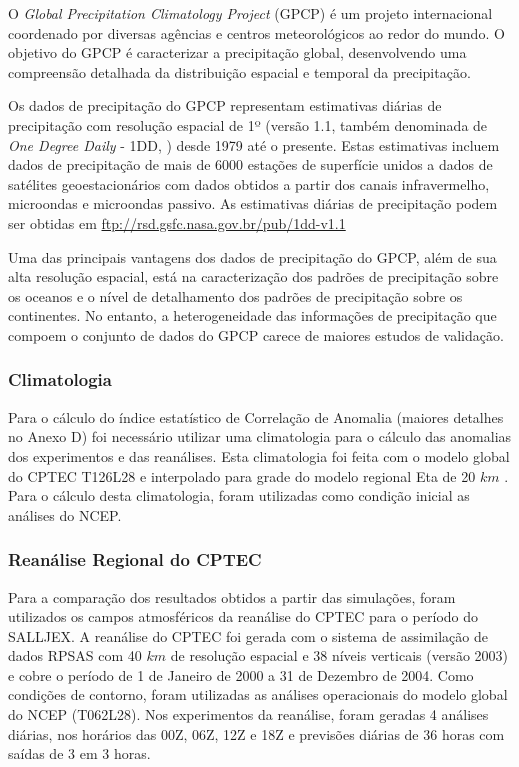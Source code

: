 O \textit{Global Precipitation Climatology Project} (GPCP) \cite{wcrp86} é um projeto internacional coordenado por diversas agências e centros meteorológicos ao redor do mundo. O objetivo do GPCP é caracterizar a precipitação global, desenvolvendo uma compreensão detalhada da distribuição espacial e temporal da precipitação.

Os dados de precipitação do GPCP representam estimativas diárias de precipitação com resolução espacial de 1º (versão 1.1, também denominada de \textit{One Degree Daily} - 1DD, \cite{huffmanetal97}) desde 1979 até o presente. Estas estimativas incluem dados de precipitação de mais de 6000 estações de superfície unidos a dados de satélites geoestacionários com dados obtidos a partir dos canais  infravermelho, microondas e microondas passivo. As estimativas diárias de precipitação podem ser obtidas em \url{ftp://rsd.gsfc.nasa.gov.br/pub/1dd-v1.1}

Uma das principais vantagens dos dados de precipitação do GPCP, além de sua alta resolução espacial, está na caracterização dos padrões de precipitação sobre os oceanos e o nível de detalhamento dos padrões de precipitação sobre os continentes. No entanto, a heterogeneidade das informações de precipitação que compoem o conjunto de dados do GPCP carece de maiores estudos de validação.

\subsubsection{Climatologia}

Para o cálculo do índice estatístico de Correlação de Anomalia (maiores detalhes no Anexo D) foi necessário utilizar uma climatologia para o cálculo das anomalias dos experimentos e das reanálises. Esta climatologia foi feita com o modelo global do CPTEC T126L28 e interpolado para grade do modelo regional Eta de 20 $km$ \cite{sapucci09}. Para o cálculo desta climatologia, foram utilizadas como condição inicial as análises do NCEP.

\subsubsection{Reanálise Regional do CPTEC}
    
Para a comparação dos resultados obtidos a partir das simulações, foram utilizados os campos atmosféricos da reanálise do CPTEC \cite{aravequiaetal07} para o período do SALLJEX. A reanálise do CPTEC foi gerada com o sistema de assimilação de dados RPSAS com 40 $km$ de resolução espacial e 38 níveis verticais (versão 2003) e cobre o período de 1 de Janeiro de 2000 a 31 de Dezembro de 2004. Como condições de contorno, foram utilizadas as análises operacionais do modelo global do NCEP (T062L28). Nos experimentos da reanálise, foram geradas 4 análises diárias, nos horários das 00Z, 06Z, 12Z e 18Z e previsões diárias de 36 horas com saídas de 3 em 3 horas. 


